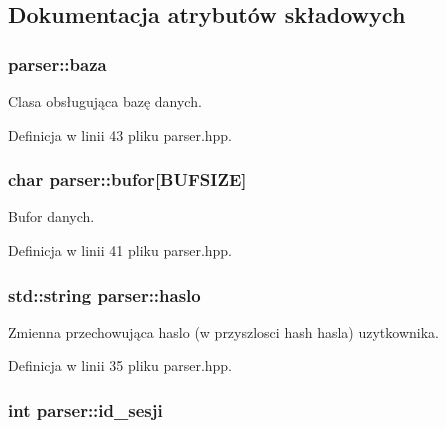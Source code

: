\subsection{Dokumentacja atrybutów składowych}
\hypertarget{a00005_21b4b313249353e48f7ea67f534ee519}{
\subsubsection[{baza}]{ {\bf parser::baza}}}
\label{dd/dad/a00005_21b4b313249353e48f7ea67f534ee519}


Clasa obsługująca bazę danych. 



Definicja w linii 43 pliku parser.hpp.\hypertarget{a00005_2e7575bebca6d0fd9f5a8bfe6fc652d0}{
\subsubsection[{bufor}]{\setlength{\rightskip}{0pt plus 5cm}char {\bf parser::bufor}\mbox{[}BUFSIZE\mbox{]}}}
\label{dd/dad/a00005_2e7575bebca6d0fd9f5a8bfe6fc652d0}


Bufor danych. 



Definicja w linii 41 pliku parser.hpp.\hypertarget{a00005_2fc04d16e2ba688c5b306a2ad6770039}{
\subsubsection[{haslo}]{\setlength{\rightskip}{0pt plus 5cm}std::string {\bf parser::haslo}}}
\label{dd/dad/a00005_2fc04d16e2ba688c5b306a2ad6770039}


Zmienna przechowująca haslo (w przyszlosci hash hasla) uzytkownika. 



Definicja w linii 35 pliku parser.hpp.\hypertarget{a00005_aa8407d10d299b524fa2f74532e537ac}{
\subsubsection[{id\_\-sesji}]{\setlength{\rightskip}{0pt plus 5cm}int {\bf parser::id\_\-sesji}}}
\label{dd/dad/a00005_aa8407d10d299b524fa2f74532e537ac}


